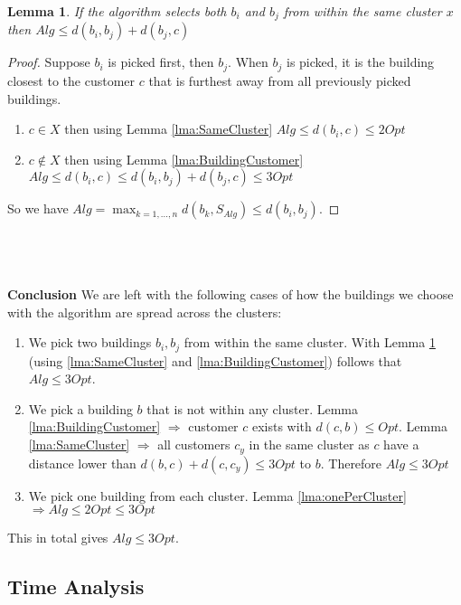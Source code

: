 \documentclass{article}
\newtheorem{lemma}[theorem]{Lemma}
\begin{document}
\begin{lemma}\label{lma:pickSameCluster}
    If the algorithm selects both $b_i$ and $b_j$ from within the same cluster $x$ then $Alg \leq d(b_i,b_j)+d(b_j,c)$
\end{lemma}
\begin{proof}
    Suppose $b_i$ is picked first, then $b_j$. When $b_j$ is picked, it is the building closest to the customer $c$ that is furthest away from all previously picked buildings.
    \begin{enumerate}[label=\textbf{Case \arabic*:}, left=0pt, itemindent=*, labelindent=1em]
        \item $c\in X$ then using Lemma \ref{lma:SameCluster} $Alg\leq d(b_i,c)\leq 2Opt$
        \item $c\not\in X$ then using Lemma \ref{lma:BuildingCustomer} $Alg \leq d(b_i,c) \leq d(b_i,b_j)+d(b_j,c)\leq 3Opt$
    \end{enumerate}
    So we have $Alg=\max_{k=1,...,n} d(b_k,S_{Alg})\leq d(b_i,b_j)$.
\end{proof}
\ \\
\ \\
\ \\
\noindent
\textbf{Conclusion} We are left with the following cases of how the buildings we choose with the algorithm are spread across the clusters:
\begin{enumerate}[label=\textbf{Case \arabic*:}, left=0pt, itemindent=*, labelindent=1em]
    \item We pick two buildings $b_i,b_j$ from within the same cluster. With Lemma \ref{lma:pickSameCluster} (using \ref{lma:SameCluster} and \ref{lma:BuildingCustomer}) follows that $Alg\leq 3Opt$.
    \item  We pick a building $b$ that is not within any cluster. Lemma \ref{lma:BuildingCustomer} $\Rightarrow$ customer $c$ exists with $d(c,b) \leq Opt$. Lemma \ref{lma:SameCluster} $\Rightarrow$ all customers $c_y$ in the same cluster as $c$ have a distance lower than $d(b,c) + d(c,c_y) \leq 3Opt$ to $b$. Therefore $Alg \leq 3Opt$
    \item We pick one building from each cluster. Lemma \ref{lma:onePerCluster} $\Rightarrow Alg \leq 2Opt \leq 3Opt$ 
\end{enumerate}
This in total gives $Alg \leq 3Opt$.

\subsection{Time Analysis}
\end{document}
